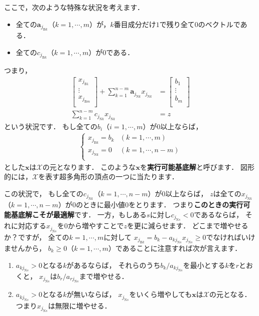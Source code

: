 ﻿\documentclass[a4paper]{jsarticle}
\begin{document}
ここで，次のような特殊な状況を考えます．
\begin{screen}
\begin{itemize}
\item{全ての$\boldsymbol{a}_{j_{\mathrm{B}k}}$（$k=1,\cdots,m$）が，$k$番目成分だけ$1$で残り全て$0$のベクトルである．}
\item{全ての$c_{j_{\mathrm{B}k}}$（$k=1,\cdots,m$）が$0$である．}
\end{itemize}
\end{screen}
つまり，
\begin{align*}
\begin{bmatrix}
x_{j_{\mathrm{B}1}} \\
\vdots \\
x_{j_{\mathrm{B}m}} \\
\end{bmatrix}+\sum_{k=1}^{n-m}\boldsymbol{a}_{j_{\mathrm{N}k}}x_{j_{\mathrm{N}k}}
&=\begin{bmatrix}
b_{1} \\
\vdots \\
b_{m} \\
\end{bmatrix}
\\
\sum_{k=1}^{n-m}c_{j_{\mathrm{N}k}}x_{j_{\mathrm{N}k}}&=z
\end{align*}
という状況です．
もし全ての$b_{i}$（$i=1,\cdots,m$）が$0$以上ならば，
\begin{align*}
\begin{cases}
x_{j_{\mathrm{B}k}}=b_{k} & (k=1,\cdots,m) \\
x_{j_{\mathrm{N}k}}=0     & (k=1,\cdots,n-m) \\
\end{cases}
\end{align*}
とした$\boldsymbol{x}$は$\mathcal{X}$の元となります．
このような$\boldsymbol{x}$を{\bf 実行可能基底解}と呼びます．
図形的には，$\mathcal{X}$を表す超多角形の頂点の一つに当たります．

この状況で，
もし全ての$c_{j_{\mathrm{N}k}}$（$k=1,\cdots,n-m$）が$0$以上ならば，
$z$は全ての$x_{j_{\mathrm{N}k}}$（$k=1,\cdots,n-m$）が$0$のときに最小値$0$をとります．
つまり{\bf このときの実行可能基底解こそが最適解}です．
一方，もしある$s$に対し$c_{j_{\mathrm{N}s}}<0$であるならば，
それに対応する$x_{j_{\mathrm{N}s}}$を$0$から増やすことで$z$を更に減らせます．
どこまで増やせるか？ですが，
全ての$k=1,\cdots,m$に対して
$x_{j_{\mathrm{B}k}}=b_{k}-a_{kj_{\mathrm{N}s}}x_{j_{\mathrm{N}s}}\geq 0$でなければいけませんから，
$b_{k}\geq 0$（$k=1,\cdots,m$）であることに注意すれば次が言えます．
\begin{enumerate}
\item{
$a_{kj_{\mathrm{N}s}}>0$となる$k$があるならば，
それらのうち$b_{k}/a_{kj_{\mathrm{N}s}}$を最小とする$k$を$r$とおくと，
$x_{j_{\mathrm{N}s}}$は$b_{r}/a_{rj_{\mathrm{N}s}}$まで増やせる．
}
\item{
$a_{kj_{\mathrm{N}s}}>0$となる$k$が無いならば，
$x_{j_{\mathrm{N}s}}$をいくら増やしても$\boldsymbol{x}$は$\mathcal{X}$の元となる．
つまり$x_{j_{\mathrm{N}s}}$は無限に増やせる．
}
\end{enumerate}
\end{document}
